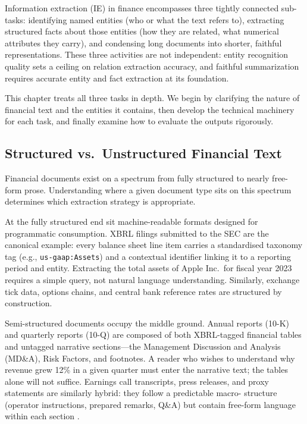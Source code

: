 Information extraction (IE) in finance encompasses three tightly connected sub-tasks:
identifying named entities (who or what the text refers to), extracting structured facts
about those entities (how they are related, what numerical attributes they carry), and
condensing long documents into shorter, faithful representations. These three activities
are not independent: entity recognition quality sets a ceiling on relation extraction
accuracy, and faithful summarization requires accurate entity and fact extraction at
its foundation.

This chapter treats all three tasks in depth. We begin by clarifying the nature of
financial text and the entities it contains, then develop the technical machinery for
each task, and finally examine how to evaluate the outputs rigorously.

\subsection{Structured vs.\ Unstructured Financial Text}
\label{sec:ch14-structured-vs-unstructured}

Financial documents exist on a spectrum from fully structured to nearly free-form prose.
Understanding where a given document type sits on this spectrum determines which
extraction strategy is appropriate.

At the fully structured end sit machine-readable formats designed for programmatic
consumption. XBRL filings submitted to the SEC are the canonical example: every balance
sheet line item carries a standardised taxonomy tag (e.g., \texttt{us-gaap:Assets}) and
a contextual identifier linking it to a reporting period and entity. Extracting the total
assets of Apple Inc.\ for fiscal year 2023 requires a simple query, not natural language
understanding. Similarly, exchange tick data, options chains, and central bank reference
rates are structured by construction.

Semi-structured documents occupy the middle ground. Annual reports (10-K) and quarterly
reports (10-Q) are composed of both XBRL-tagged financial tables and untagged narrative
sections---the Management Discussion and Analysis (MD\&A), Risk Factors, and footnotes.
A reader who wishes to understand why revenue grew 12\% in a given quarter must enter the
narrative text; the tables alone will not suffice. Earnings call transcripts, press
releases, and proxy statements are similarly hybrid: they follow a predictable macro-
structure (operator instructions, prepared remarks, Q\&A) but contain free-form language
within each section \cite{loughran2020textual}.

